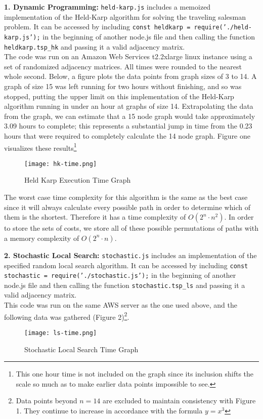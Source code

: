 


\textbf{1. Dynamic Programming:} \texttt{held-karp.js} includes a memoized implementation of the Held-Karp algorithm for solving the traveling salesman problem. It can be accessed by including \texttt{const heldkarp = require('./held-karp.js');} in the beginning of another node.js file and then calling the function \texttt{heldkarp.tsp\_hk} and passing it a valid adjacency matrix. \\

The code was run on an Amazon Web Services t2.2xlarge linux instance using a set of randomized adjacency matrices. All times were rounded to the nearest whole second. Below, a figure plots the data points from graph sizes of 3 to 14. A graph of size 15 was left running for two hours without finishing, and so was stopped, putting the upper limit on this implementation of the Held-Karp algorithm running in under an hour at graphs of size 14. Extrapolating the data from the graph, we can estimate that a 15 node graph would take approximately 3.09 hours to complete; this represents a substantial jump in time from the 0.23 hours that were required to completely calculate the 14 node graph. Figure one visualizes these results\footnote{This one hour time is not included on the graph since its inclusion shifts the scale so much as to make earlier data points impossible to see.}
\begin{figure}[h]
    \texttt{[image: hk-time.png]}
    \caption{Held Karp Execution Time Graph}
    \label{fig:hk-comp}
\end{figure}

The worst case time complexity for this algorithm is the same as the best case since it will always calculate every possible path in order to determine which of them is the shortest. Therefore it has a time complexity of $O(2^n\cdot n^2)$. In order to store the sets of costs, we store all of these possible permutations of paths with a memory complexity of $O(2^n\cdot n)$.

\noindent\textbf{2. Stochastic Local Search:} \texttt{stochastic.js} includes an implementation of the specified random local search algorithm. It can be accessed by including \texttt{const stochastic = require('./stochastic.js');} in the beginning of another node.js file and then calling the function \texttt{stochastic.tsp\_ls} and passing it a valid adjacency matrix. \\

This code was run on the same AWS server as the one used above, and the following data was gathered (Figure 2)\footnote{Data points beyond $n=14$ are excluded to maintain consistency with Figure 1. They continue to increase in accordance with the formula $y=x^3$}.
\begin{figure}[h]
    \texttt{[image: ls-time.png]}
    \caption{Stochastic Local Search Time Graph}
    \label{fig:sl-comp}
\end{figure}

